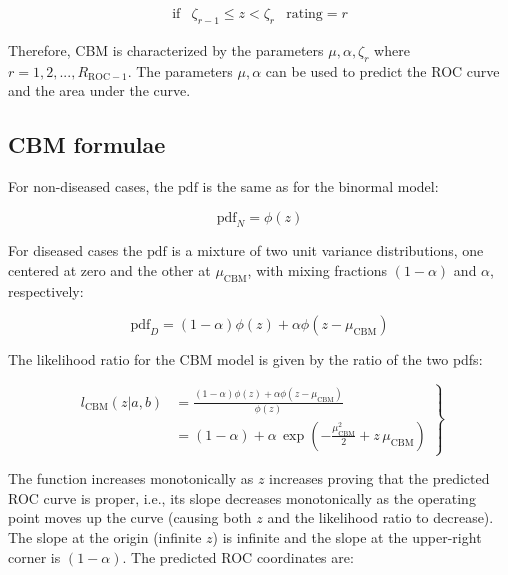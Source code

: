 \documentclass[
]{book}
\begin{document}
\begin{equation} 
\begin{matrix}
\text{if} & \zeta_{r-1} \le z < \zeta_r & \text{rating} = r 
\end{matrix}
\end{equation}

Therefore, CBM is characterized by the parameters \(\mu, \alpha, \zeta_r\) where \(r=1,2,...,R_{\text{ROC}-1}\). The parameters \(\mu, \alpha\) can be used to predict the ROC curve and the area under the curve.

\hypertarget{proper-roc-models-cbm-formulae}{%
\subsection{CBM formulae}\label{proper-roc-models-cbm-formulae}}

For non-diseased cases, the \(\text{pdf}\) is the same as for the binormal model:

\begin{equation}
\text{pdf}_N=\phi(z) 
\label{eq:proper-roc-models-cbm-pdfn}
\end{equation}

For diseased cases the \(\text{pdf}\) is a mixture of two unit variance distributions, one centered at zero and the other at \(\mu_\text{CBM}\), with mixing fractions \((1-\alpha)\) and \(\alpha\), respectively:

\begin{equation}
\text{pdf}_D=\left( 1-\alpha \right)\phi(z) + \alpha \phi(z-\mu_\text{CBM})
\label{eq:proper-roc-models-cbm-pdfd}
\end{equation}

The likelihood ratio for the CBM model is given by the ratio of the two pdfs:

\begin{equation}
\left.\begin{aligned}
l_\text{CBM}\left( z|a,b \right)&=\frac{\left( 1-\alpha \right)\phi(z) + \alpha \phi(z-\mu_\text{CBM})}{\phi(z)}\\
&=\left( 1-\alpha \right)+\alpha \, \exp\left(-\frac{\mu_\text{CBM}^2}{2}+z\,\mu_\text{CBM}  \right)
\end{aligned}\right\}
\label{eq:proper-roc-models-cbm-likelihood}
\end{equation}

The function increases monotonically as \(z\) increases proving that the predicted ROC curve is proper, i.e., its slope decreases monotonically as the operating point moves up the curve (causing both \(z\) and the likelihood ratio to decrease). The slope at the origin (infinite \(z\)) is infinite and the slope at the upper-right corner is \((1-\alpha)\). The predicted ROC coordinates are:
\end{document}
